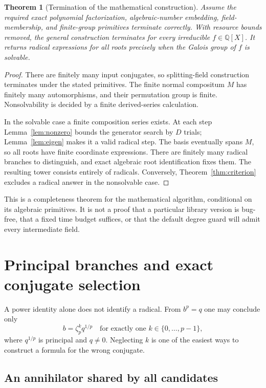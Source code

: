\documentclass[11pt,a4paper]{article}
\newcommand{\Q}{\mathbb Q}
\newtheorem{theorem}{Theorem}[section]
\theoremstyle{definition}
\theoremstyle{remark}
\begin{document}
\begin{theorem}[Termination of the mathematical construction]\label{thm:complete}
Assume the required exact polynomial factorization, algebraic-number embedding, field-membership, and finite-group primitives terminate correctly. With resource bounds removed, the general construction terminates for every irreducible $f\in\Q[X]$. It returns radical expressions for all roots precisely when the Galois group of $f$ is solvable.
\end{theorem}
\begin{proof}
There are finitely many input conjugates, so splitting-field construction terminates under the stated primitives. The finite normal compositum $M$ has finitely many automorphisms, and their permutation group is finite. Nonsolvability is decided by a finite derived-series calculation.

In the solvable case a finite composition series exists. At each step Lemma~\ref{lem:nonzero} bounds the generator search by $D$ trials; Lemma~\ref{lem:eigen} makes it a valid radical step. The basis eventually spans $M$, so all roots have finite coordinate expressions. There are finitely many radical branches to distinguish, and exact algebraic root identification fixes them. The resulting tower consists entirely of radicals. Conversely, Theorem~\ref{thm:criterion} excludes a radical answer in the nonsolvable case.
\end{proof}

This is a completeness theorem for the mathematical algorithm, conditional on its algebraic primitives. It is not a proof that a particular library version is bug-free, that a fixed time budget suffices, or that the default degree guard will admit every intermediate field.

\section{Principal branches and exact conjugate selection}\label{sec:branches}

A power identity alone does not identify a radical. From $b^p=q$ one may conclude only
\begin{equation}
 b=\zeta_p^k q^{1/p}
 \quad\text{for exactly one }k\in\{0,\ldots,p-1\},
 \label{eq:branch}
\end{equation}
where $q^{1/p}$ is principal and $q\ne0$. Neglecting $k$ is one of the easiest ways to construct a formula for the wrong conjugate.

\subsection{An annihilator shared by all candidates}
\end{document}
